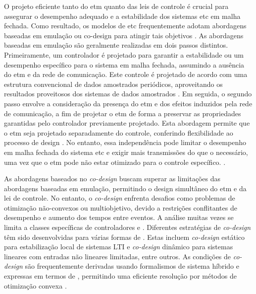 O projeto eficiente tanto do \acrshort{etm} quanto das leis de controle é crucial para assegurar o desempenho adequado e a estabilidade dos sistemas \acrshort{etc} em malha fechada. Como resultado, os modelos de \acrshort{etc} frequentemente adotam abordagens baseadas em emulação ou co-design para atingir tais objetivos \cite{coutinho2021, peng2018}. As abordagens baseadas em emulação são geralmente realizadas em dois passos distintos. Primeiramente, um controlador é projetado para garantir a estabilidade ou um desempenho específico para o sistema em malha fechada, assumindo a ausência do \acrshort{etm} e da rede de comunicação. Este controle é projetado de acordo com uma estrutura convencional de dados amostrados periódicos, aproveitando os resultados proveitosos dos sistemas de dados amostrados \cite{coutinho2021,peng2018}. Em seguida, o segundo passo envolve a consideração da presença do \acrshort{etm} e dos efeitos induzidos pela rede de comunicação, a fim de projetar o \acrshort{etm} de forma a preservar as propriedades garantidas pelo controlador previamente projetado. Esta abordagem permite que o \acrshort{etm} seja projetado separadamente do controle, conferindo flexibilidade ao processo de design \cite{coutinho2021,peng2018}. No entanto, essa independência pode limitar o desempenho em malha fechada do sistema \acrshort{etc} e exigir mais transmissões do que o necessário, uma vez que o \acrshort{etm} pode não estar otimizado para o controle específico. \cite{coutinho2021}.

As abordagens baseados no \textit{co-design} buscam superar as limitações das abordagens baseadas em emulação, permitindo o design simultâneo do \acrshort{etm} e da lei de controle. No entanto, o \textit{co-design} enfrenta desafios como problemas de otimização não-convexos ou multiobjetivo, devido a restrições conflitantes de desempenho e aumento dos tempos entre eventos. A análise muitas vezes se limita a classes específicas de controladores e  \cite{coutinho2021}. Diferentes estratégias de \textit{co-design} têm sido desenvolvidas para várias formas de . Estas incluem \textit{co-design} estático para estabilização local de sistemas LTI e \textit{co-design} dinâmico para sistemas lineares com entradas não lineares limitadas, entre outros. As condições de \textit{co-design} são frequentemente derivadas usando formalismos de sistema híbrido e expressas em termos de , permitindo uma eficiente resolução por métodos de otimização convexa \cite{coutinho2021}.

